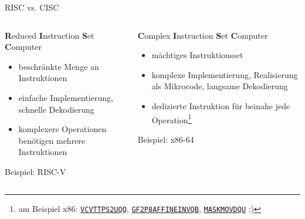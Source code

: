 \documentclass[
  german,            %
  aspectratio=169,    %
]{tumbeamer}
\begin{document}
\begin{frame}[c]{RISC vs. CISC}{}
	\begin{columns}
		\begin{column}{0.5\textwidth}
			\centering\textbf{R}educed \textbf{I}nstruction \textbf{S}et \textbf{C}omputer
			\vspace{0.5\baselineskip}
			\begin{itemize}
				\item beschränkte Menge an Instruktionen
				\item einfache Implementierung, schnelle Dekodierung
				\item komplexere Operationen benötigen mehrere Instruktionen
			\end{itemize}
			\vspace{0.5\baselineskip}
			Beispiel: RISC-V
		\end{column}
		\begin{column}{0.5\textwidth}
			\centering\textbf{C}omplex \textbf{I}nstruction \textbf{S}et \textbf{C}omputer
			\vspace{0.5\baselineskip}
			\begin{itemize}
				\item mächtiges Instruktionsset
				\item komplexe Implementierung, Realisierung als Mikrocode, langsame Dekodierung
				\item dedizierte Instruktion für beinahe jede Operation\footnote[frame]{am Beispiel x86: \href{https://www.felixcloutier.com/x86/vcvttps2uqq}{\texttt{VCVTTPS2UQQ}}, \href{https://www.felixcloutier.com/x86/gf2p8affineinvqb}{\texttt{GF2P8AFFINEINVQB}}, \href{https://www.felixcloutier.com/x86/maskmovdqu}{\texttt{MASKMOVDQU}} :)}
			\end{itemize}
			\vspace{0.5\baselineskip}
			Beispiel: x86-64
		\end{column}
	\end{columns}
\end{frame}
\end{document}
